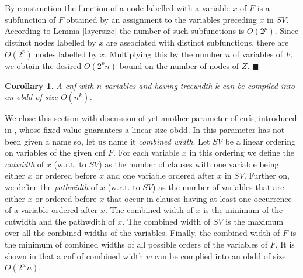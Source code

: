 \documentclass{article}
\newtheorem{corollary}{Corollary}
\begin{document}
By construction the function of a node labelled with a variable $x$ of $F$ is a subfunction of
$F$ obtained by an assignment to the variables preceding $x$ in $SV$. According to Lemma \ref{layersize}
the number of such subfunctions is $O(2^p)$. Since distinct nodes labelled by $x$ are associated
with distinct subfunctions, there are $O(2^p)$ nodes labelled by $x$. Multiplying this by the number
$n$ of variables of $F$, we obtain the desired $O(2^pn)$ bound on the number of nodes of $Z$. 
$\blacksquare$

\begin{corollary}
A {\sc cnf} with $n$ variables and having treewidth $k$ can be compiled into an {\sc obdd}
of size $O(n^k)$.
\end{corollary}

We close this section with discussion of yet another parameter of {\sc cnf}s, introduced in \cite{HuDar}, 
whose fixed value guarantees a linear size {\sc obdd}. 
In \cite{HuDar} this parameter has not been given a name so, let us name it \emph{combined width}.
Let $SV$ be a linear ordering on variables of
the given {\sc cnf} $F$. For each variable $x$ in this ordering we define the \emph{cutwidth} of $x$ (w.r.t. to $SV$)
as the number of clauses with one variable being either $x$ or ordered before $x$ and one variable ordered after $x$ in $SV$. 
Further on, we define the \emph{pathwidth} of $x$ (w.r.t. to $SV$) as the number of variables that are either $x$ or ordered
before $x$ that occur in clauses having at least one occurrence of a variable ordered after $x$. 
The combined width of $x$ is the minimum of the cutwidth and the pathwdith of $x$. The combined width
of $SV$ is the maximum over all the combined widths of the variables. Finally, the combined width of $F$ 
is the minimum of combined widths of all possible orders of the variables of $F$. It is shown in \cite{HuDar}
that a {\sc cnf} of combined width $w$ can be complied into an {\sc obdd} of size $O(2^wn)$. 
\end{document}
